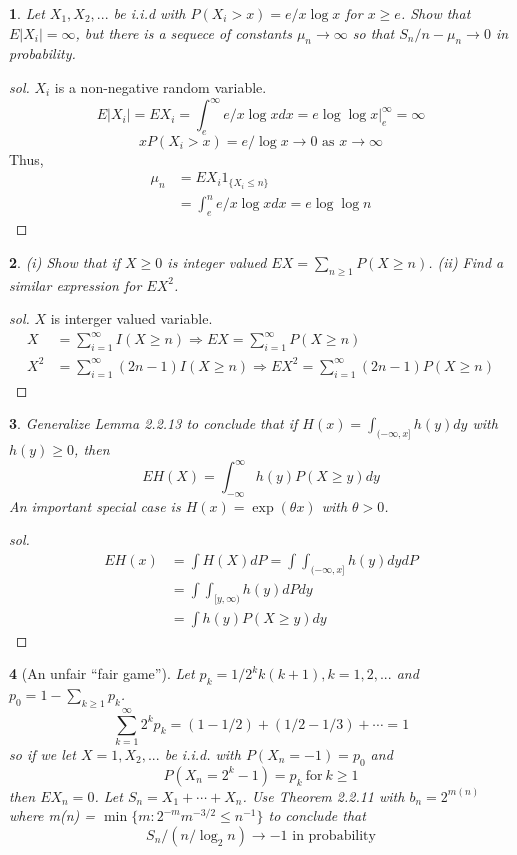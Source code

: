 \documentclass{report}
\newtheorem{ex}{}[section]
\begin{document}
\begin{ex}
Let $X_1,X_2,...$ be i.i.d with $P(X_i > x) = e/x\log x$ for $x \ge e$. Show that $E|X_i| = \infty$, but there is a sequece of constants $\mu_n \to \infty$ so that $S_n/n - \mu_n \to 0$ in probability.
\end{ex}
\begin{proof}[sol]
$X_i$ is a non-negative random variable.
\[E|X_i| = EX_i = \int_e^\infty e/x\log xdx = e\log\log x|^\infty_e = \infty\]
\[xP(X_i > x) = e/\log x \to 0 \text{ as } x \to \infty\]
Thus,
\begin{align*}
    \mu_n &= EX_i1_{\{X_i \le n\}}\\
    &=\int_e^n e/x\log xdx = e\log\log n
\end{align*}
\end{proof}
\begin{ex}(i) Show that if $X\ge 0$ is integer valued $EX = \sum_{n\ge 1}P(X\ge n)$. (ii) Find a similar expression for $EX^2$.
\end{ex}
\begin{proof}[sol]
$X$ is interger valued variable.
\begin{align*}
	X &= \sum_{i=1}^\infty I(X \ge n) \Rightarrow EX = \sum_{i=1}^\infty P(X \ge n)\\
	X^2 &=  \sum_{i=1}^\infty (2n-1)I(X \ge n) \Rightarrow EX^2 = \sum_{i=1}^\infty (2n-1)P(X \ge n)
\end{align*}
\end{proof}
\begin{ex}
Generalize Lemma 2.2.13 to conclude that if $H(x) = \int_{(-\infty, x]} h(y)dy$ with $h(y) \ge 0$, then
\[EH(X) = \int_{-\infty}^\infty h(y)P(X \ge y)dy\]
An important special case is $H(x) = \exp (\theta x)$ with $\theta >0$.
\end{ex}
\begin{proof}[sol]
\begin{align*}
    EH(x) &= \int H(X)dP = \int\int_{(-\infty, x]} h(y)dydP\\
    &= \int\int_{[y,\infty)}h(y)dPdy\\
    &= \int h(y)P(X \ge y)dy
\end{align*}
\end{proof}
\begin{ex}[An unfair ``fair game''] Let $p_k  = 1/2^kk(k+1), k = 1,2,...$ and $p_0 = 1 -\sum_{k\ge 1}p_k$.
\[\sum_{k=1}^\infty 2^kp_k = (1 - 1/2) + (1/2 - 1/3) + \dotsb = 1\]
so if we let $X=1,X_2,...$ be i.i.d. with $P(X_n = -1) = p_0$ and 
\[P(X_n = 2^k - 1) = p_k\ \text{for} \ k \ge 1\]
then $EX_n = 0$. Let $S_n = X_1 + \dotsb + X_n$. Use Theorem 2.2.11 with $b_n = 2^{m(n)}$ where m(n) = $\min\{m : 2^{-m} m^{-3/2} \le n^{-1}\}$ to conclude that 
\[S_n/(n/\log_2 n) \to -1 \text{ in probability}\]
\end{ex}
\end{document}
